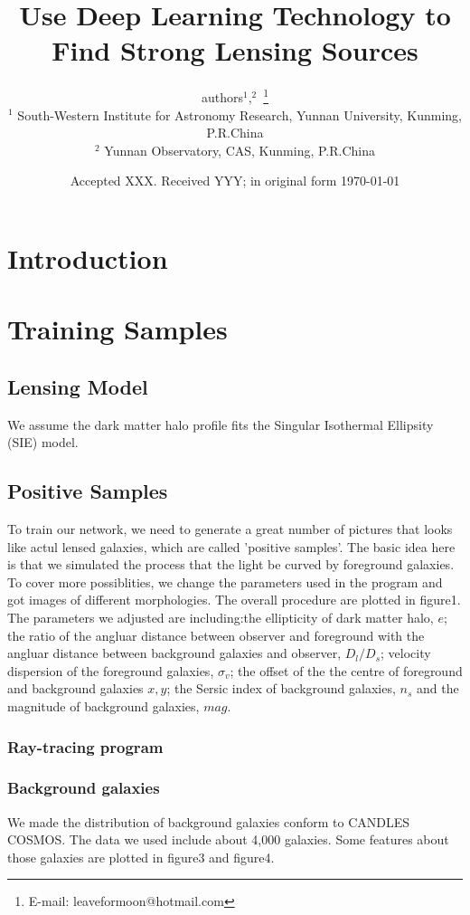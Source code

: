 \documentclass[a4paper,fleqn,usenatbib]{mnras}
\title[Working Log: Use Deep Learning Technology to Find Strong Lensing Sources]{Use Deep Learning Technology to Find Strong Lensing Sources}
\author[He]
	{authors$^1,^2$ \thanks{E-mail: leaveformoon@hotmail.com}\\
$^1$ South-Western Institute for Astronomy Research, Yunnan University, Kunming, P.R.China\\
$^2$ Yunnan Observatory, CAS, Kunming, P.R.China
}
\date{Accepted XXX. Received YYY; in original form \today}
\begin{document}
\label{firstpage}
\maketitle

\section{Introduction}
\section{Training Samples}
\subsection{Lensing Model}
We assume the dark matter halo profile fits the Singular Isothermal Ellipsity (SIE) model.
\subsection{Positive Samples}
To train our network, we need to generate a great number of pictures that looks like actul lensed galaxies, which are called 'positive samples'. The basic idea here is that we simulated the process that the light be curved by foreground galaxies. To cover more possiblities, we change the parameters used in the program and got images of different morphologies. The overall procedure are plotted in figure1.\\
The parameters we adjusted are including:the ellipticity of dark matter halo, $e$; the ratio of the angluar distance between observer and foreground with the angluar distance between background galaxies and observer, $D_{l}/D_s$; velocity dispersion of the foreground galaxies, $\sigma_v$; the offset of the the centre of foreground and background galaxies $x,y$; the Sersic index of background galaxies, $n_s$ and the magnitude of background galaxies, $mag$.\\
\subsubsection{Ray-tracing program}
\subsubsection{Background galaxies}
We made the distribution of background galaxies conform to CANDLES COSMOS. The data we used include about 4,000 galaxies. Some features about those galaxies are plotted in figure3 and figure4. 
\end{document}
